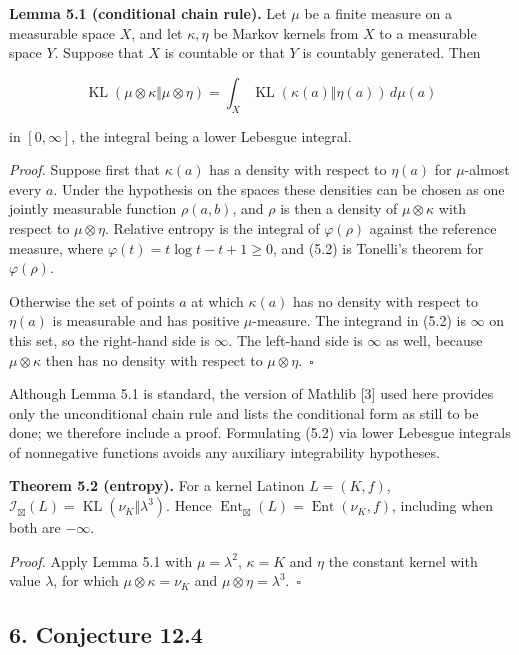 \documentclass[english,11pt,a4paper]{article}
\begin{document}
\textbf{Lemma 5.1 (conditional chain rule).} Let \(\mu\) be a finite measure on a measurable space \(X\), and let \(\kappa,\eta\) be Markov kernels from \(X\) to a measurable space \(Y\). Suppose that \(X\) is countable or that \(Y\) is countably generated. Then

\nopagebreak[4]
\[\operatorname{KL}(\mu\otimes\kappa\Vert\mu\otimes\eta)=\int_X\operatorname{KL}(\kappa(a)\Vert\eta(a))\,d\mu(a)\tag{5.2}\]

in \([0,\infty]\), the integral being a lower Lebesgue integral.

\emph{Proof.} Suppose first that \(\kappa(a)\) has a density with respect to \(\eta(a)\) for \(\mu\)-almost every \(a\). Under the hypothesis on the spaces these densities can be chosen as one jointly measurable function \(\rho(a,b)\), and \(\rho\) is then a density of \(\mu\otimes\kappa\) with respect to \(\mu\otimes\eta\). Relative entropy is the integral of \(\varphi(\rho)\) against the reference measure, where \(\varphi(t)=t\log t-t+1\ge0\), and (5.2) is Tonelli's theorem for \(\varphi(\rho)\).

Otherwise the set of points \(a\) at which \(\kappa(a)\) has no density with respect to \(\eta(a)\) is measurable and has positive \(\mu\)-measure. The integrand in (5.2) is \(\infty\) on this set, so the right-hand side is \(\infty\). The left-hand side is \(\infty\) as well, because \(\mu\otimes\kappa\) then has no density with respect to \(\mu\otimes\eta\).~\(\square\)

Although Lemma 5.1 is standard, the version of Mathlib {[}3{]} used here provides only the unconditional chain rule and lists the conditional form as still to be done; we therefore include a proof. Formulating (5.2) via lower Lebesgue integrals of nonnegative functions avoids any auxiliary integrability hypotheses.

\textbf{Theorem 5.2 (entropy).} For a kernel Latinon \(L=(K,f)\), \(\mathcal I_{\boxtimes}(L)=\operatorname{KL}(\nu_K\Vert\lambda^3)\). Hence \(\operatorname{Ent}_{\boxtimes}(L)=\operatorname{Ent}(\nu_K,f)\), including when both are \(-\infty\).

\emph{Proof.} Apply Lemma 5.1 with \(\mu=\lambda^2\), \(\kappa=K\) and \(\eta\) the constant kernel with value \(\lambda\), for which \(\mu\otimes\kappa=\nu_K\) and \(\mu\otimes\eta=\lambda^3\).~\(\square\)

\subsection{6. Conjecture 12.4}\label{conjecture-12.4}
\end{document}
